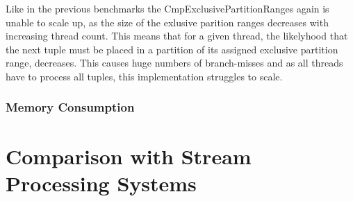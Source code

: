 Like in the previous benchmarks the CmpExclusivePartitionRanges again is unable to scale up, as the size of the exlusive parition ranges decreases with increasing thread count.
This means that for a given thread, the likelyhood that the next tuple must be placed in a partition of its assigned exclusive partition range, decreases.
This causes huge numbers of branch-misses and as all threads have to process all tuples, this implementation struggles to scale.

\subsubsection{Memory Consumption}

\section{Comparison with Stream Processing Systems}
